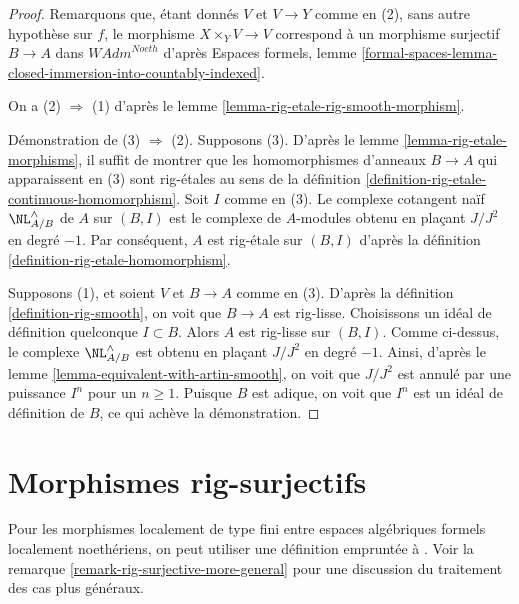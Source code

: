 \begin{proof}
Remarquons que, étant donnés $V$ et $V \to Y$ comme en (2), sans autre
hypothèse sur $f$, le morphisme $X \times_Y V \to V$
correspond à un morphisme surjectif $B \to A$ dans $\textit{WAdm}^{Noeth}$
d'après Espaces formels, lemme
\ref{formal-spaces-lemma-closed-immersion-into-countably-indexed}.

\medskip\noindent
On a (2) $\Rightarrow$ (1) d'après le
lemme \ref{lemma-rig-etale-rig-smooth-morphism}.

\medskip\noindent
Démonstration de (3) $\Rightarrow$ (2). Supposons (3). D'après le
lemme \ref{lemma-rig-etale-morphisms},
il suffit de montrer que les homomorphismes d'anneaux
$B \to A$ qui apparaissent en (3) sont rig-étales au sens de la
définition \ref{definition-rig-etale-continuous-homomorphism}.
Soit $I$ comme en (3). Le complexe cotangent naïf
$\NL_{A/B}^\wedge$ de $A$ sur $(B, I)$ est le complexe de $A$-modules
obtenu en plaçant $J/J^2$ en degré $-1$. Par conséquent, $A$ est
rig-étale sur $(B, I)$ d'après la
définition \ref{definition-rig-etale-homomorphism}.

\medskip\noindent
Supposons (1), et soient $V$ et $B \to A$ comme en (3).
D'après la définition \ref{definition-rig-smooth}, on voit que
$B \to A$ est rig-lisse. Choisissons un idéal de définition quelconque $I \subset B$.
Alors $A$ est rig-lisse sur $(B, I)$.
Comme ci-dessus, le complexe $\NL_{A/B}^\wedge$ est 
obtenu en plaçant $J/J^2$ en degré $-1$.
Ainsi, d'après le lemme \ref{lemma-equivalent-with-artin-smooth},
on voit que $J/J^2$ est annulé par
une puissance $I^n$ pour un $n \geq 1$. Puisque $B$ est adique, on voit
que $I^n$ est un idéal de définition de $B$, ce qui achève
la démonstration.
\end{proof}














\section{Morphismes rig-surjectifs}
\label{section-rig-surjective}

\noindent
Pour les morphismes localement de type fini entre espaces algébriques formels
localement noethériens, on peut utiliser une définition empruntée à \cite{ArtinII}.
Voir la remarque \ref{remark-rig-surjective-more-general} pour une discussion
du traitement des cas plus généraux.

